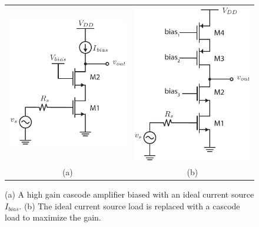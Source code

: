 \begin{figure}[tb]
\centering
\begin{tabular}{cc}
\includegraphics[scale=1.35]{15cascode_current_source_dc} &
\includegraphics[scale=1.15]{cascode_current_load_cascode.pdf}\\
(a) & (b)\\
\end{tabular}
\caption{(a) A high gain cascode amplifier biased with an ideal current source $I_{bias}$.  (b) The ideal current source load is replaced with a cascode load to maximize the gain.}  \label{fig:15cascode_current_source_dc}
\end{figure}
